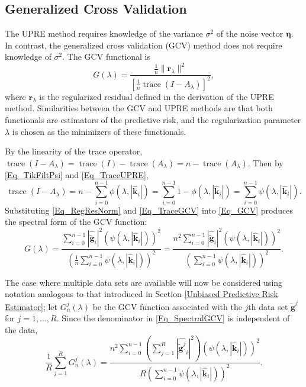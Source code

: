 \documentclass[12pt]{article}
\newcommand{\gnoise}{\widetilde{\mathbf{g}}}
\newcommand{\kdis}{\mathbf{k}}
\newcommand{\trace}{\operatorname{trace}}	%
\newcommand{\regparam}{\lambda}
\newcommand{\filt}{\phi}
\newcommand{\mfilt}{\psi}
\newcommand{\noiseSD}{\sigma}	%
\newcommand{\noise}{\bm{\eta}}	%
\newcommand{\regres}{\mathbf{r}_{\regparam}}	%
\newcommand{\A}{A_{\regparam}}	%
\newcommand{\GCV}{G}	%
\begin{document}
\subsection{Generalized Cross Validation} \label{Generalized Cross Validation}
The UPRE method requires knowledge of the variance $\noiseSD^2$ of the noise vector $\noise$. In contrast, the generalized cross validation (GCV) method does not require knowledge of $\noiseSD^2$. The GCV functional is
\begin{equation}
\label{Eq_GCV}
\GCV(\regparam) = \frac{\frac{1}{n}\|\regres\|^2}{\left[\frac{1}{n}\trace(I-\A)\right]^2},
\end{equation}
where $\regres$ is the regularized residual defined in the derivation of the UPRE method. Similarities between the GCV and UPRE methods are that both functionals are estimators of the predictive risk, and the regularization parameter $\regparam$ is chosen as the minimizers of these functionals. \par 
By the linearity of the trace operator, $\trace(I-\A) = \trace(I)-\trace(\A) = n - \trace(\A)$. Then by \eqref{Eq_TikFiltPsi} and \eqref{Eq_TraceUPRE},
\begin{equation}
\trace(I-\A) = n - \sum_{i = 0}^{n-1} \filt(\regparam,|\widehat{\kdis}_i|) = \sum_{i = 0}^{n-1} 1 - \filt(\regparam,|\widehat{\kdis}_i|) = \sum_{i = 0}^{n-1} \mfilt(\regparam,|\widehat{\kdis}_i|).
\label{Eq_TraceGCV}
\end{equation}
Substituting \eqref{Eq_RegResNorm} and \eqref{Eq_TraceGCV} into \eqref{Eq_GCV} produces the spectral form of the GCV function:
\begin{equation}
\GCV(\regparam) = \frac{\sum_{i = 0}^{n-1} |\widehat{\gnoise}_i|^2(\mfilt(\regparam,|\widehat{\kdis}_i|))^2}{(\frac{1}{n}\sum_{i = 0}^{n-1} \mfilt(\regparam,|\widehat{\kdis}_i|))^2} = \frac{n^2\sum_{i = 0}^{n-1} |\widehat{\gnoise}_i|^2(\mfilt(\regparam,|\widehat{\kdis}_i|))^2}{(\sum_{i = 0}^{n-1} \mfilt(\regparam,|\widehat{\kdis}_i|))^2}.
\label{Eq_SpectralGCV}
\end{equation} \par 
The case where multiple data sets are available will now be considered using notation analogous to that introduced in Section \ref{Unbiased Predictive Risk Estimator}; let $\GCV_n^j(\regparam)$ be the GCV function associated with the $j$th data set $\gnoise^j$ for $j = 1,\ldots,R$. Since the denominator in \eqref{Eq_SpectralGCV} is independent of the data,
\begin{equation}
\frac{1}{R}\sum_{j=1}^R \GCV_n^j(\regparam)  = \frac{n^2\sum_{i = 0}^{n-1} \left(\sum_{j=1}^R |\widehat{\gnoise^j}_i|^2\right)(\mfilt(\regparam,|\widehat{\kdis}_i|))^2}{R(\sum_{i = 0}^{n-1} \mfilt(\regparam,|\widehat{\kdis}_i|))^2}.
\label{Eq_SpectralGCVsum}
\end{equation}
\end{document}
